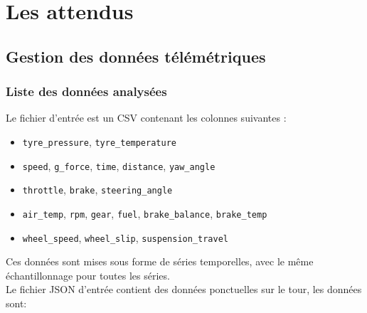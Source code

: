 \documentclass[a4paper,12pt]{report}
\begin{document}
\section{Les attendus}

\subsection{Gestion des données télémétriques}

\subsubsection{Liste des données analysées}

Le fichier d'entrée est un CSV contenant les colonnes suivantes :
\begin{itemize}
    \item \texttt{tyre\_pressure}, \texttt{tyre\_temperature}
    \item \texttt{speed}, \texttt{g\_force}, \texttt{time}, \texttt{distance}, \texttt{yaw\_angle}
    \item \texttt{throttle}, \texttt{brake}, \texttt{steering\_angle}
    \item \texttt{air\_temp}, \texttt{rpm}, \texttt{gear}, \texttt{fuel}, \texttt{brake\_balance}, \texttt{brake\_temp}
    \item \texttt{wheel\_speed}, \texttt{wheel\_slip}, \texttt{suspension\_travel}
\end{itemize}

Ces données sont mises sous forme de séries temporelles, avec le même échantillonnage pour toutes les séries.\\


Le fichier JSON d'entrée contient des données ponctuelles sur le tour, les données sont:
\end{document}
